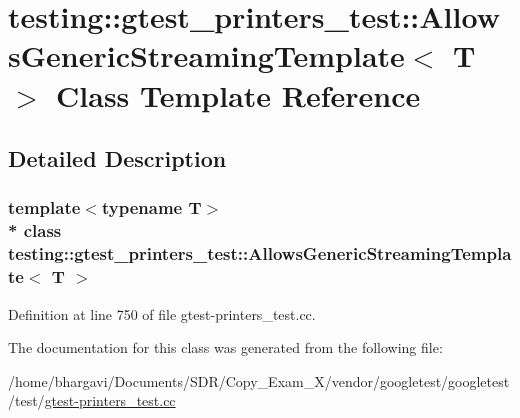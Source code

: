 \hypertarget{classtesting_1_1gtest__printers__test_1_1_allows_generic_streaming_template}{}\section{testing\+:\+:gtest\+\_\+printers\+\_\+test\+:\+:Allows\+Generic\+Streaming\+Template$<$ T $>$ Class Template Reference}
\label{classtesting_1_1gtest__printers__test_1_1_allows_generic_streaming_template}


\subsection{Detailed Description}
\subsubsection*{template$<$typename T$>$\\*
class testing\+::gtest\+\_\+printers\+\_\+test\+::\+Allows\+Generic\+Streaming\+Template$<$ T $>$}



Definition at line 750 of file gtest-\/printers\+\_\+test.\+cc.



The documentation for this class was generated from the following file\+:\begin{DoxyCompactItemize}
\item 
/home/bhargavi/\+Documents/\+S\+D\+R/\+Copy\+\_\+\+Exam\+\_\+X/vendor/googletest/googletest/test/\hyperlink{gtest-printers__test_8cc}{gtest-\/printers\+\_\+test.\+cc}\end{DoxyCompactItemize}
